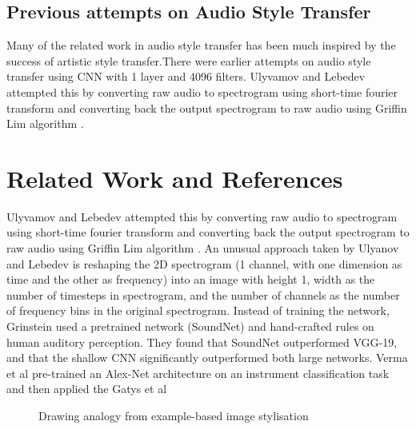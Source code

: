 \documentclass[10pt,twocolumn,letterpaper]{article}
\begin{document}
\subsection{Previous attempts on Audio Style Transfer}
Many of the related work in audio style transfer has been much inspired by the success of artistic style transfer.There were earlier attempts on audio style transfer using
CNN with 1 layer and 4096 filters. Ulyvamov and
Lebedev\cite{Authors00003} attempted this by converting raw audio to spectrogram
using short-time fourier transform and converting
back the output spectrogram to raw audio using Griffin Lim
algorithm \cite{Authors00004}.

\section{Related Work and References}
Ulyvamov and Lebedev\cite{Authors00003} attempted this by converting raw audio to spectrogram
using short-time fourier transform and converting
back the output spectrogram to raw audio using Griffin Lim
algorithm \cite{Authors00004}. An unusual approach taken by Ulyanov and
Lebedev is reshaping the 2D spectrogram (1 channel, with one dimension as time and the other as frequency) into an image with height 1, width as the number of timesteps in spectrogram, and the number of channels as the number of frequency bins in the original spectrogram. Instead of training the network, Grinstein\cite{Authors00005}
used a pretrained network (SoundNet) and hand-crafted
rules on human auditory perception. They found that SoundNet outperformed VGG-19, and that the shallow CNN significantly outperformed both large networks. Verma et al \cite{Authors00006} pre-trained an Alex-Net architecture \cite{Authors00007} on an instrument classification task and then applied the Gatys et al \cite{Authors00001}




\begin{figure}
\begin{center}
\end{center}
   \caption{Drawing analogy from example-based image stylisation}
\label{fig:short}
\end{figure}
\end{document}
